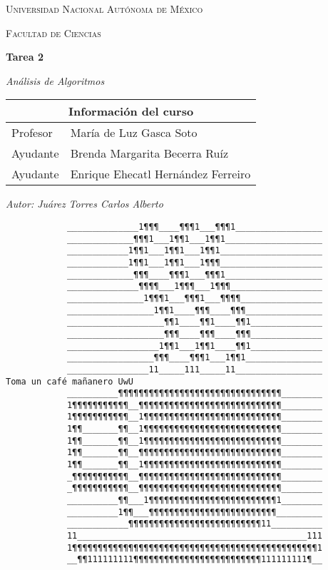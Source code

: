 \begin{titlepage}
	\centering
	
	{\scshape\LARGE Universidad Nacional Autónoma de México\par}
	\vspace{1cm}
	{\scshape\Large Facultad de Ciencias \par}
	{\huge\bfseries Tarea 2 \par}
	{\Large\itshape Análisis de Algoritmos \par}
	
	\begin{table}[ht]
	\centering
	\begin{tabular}{|l|l|}
	\hline
	\multicolumn{2}{|c|}{\cellcolor{pastelgreen}\textbf{Información del curso}} \\ \hline
	Profesor & María de Luz Gasca Soto \\
	Ayudante & Brenda Margarita Becerra Ruíz \\
	Ayudante & Enrique Ehecatl Hernández Ferreiro \\
	\hline
	\end{tabular}
	\end{table}

	{\large\itshape Autor: Juárez Torres Carlos Alberto \par}

	\begin{center}
		\begin{verbatim}
			______________1¶¶¶____¶¶¶1___¶¶¶1_________________
			_____________¶¶¶1___1¶¶1___1¶¶1___________________
			____________1¶¶1___1¶¶1___1¶¶1____________________
			____________1¶¶1___1¶¶1___1¶¶¶____________________
			_____________¶¶¶____¶¶¶1___¶¶¶1___________________
			______________¶¶¶¶___1¶¶¶___1¶¶¶__________________
			_______________1¶¶¶1___¶¶¶1___¶¶¶¶________________
			_________________1¶¶1____¶¶¶____¶¶¶_______________
			___________________¶¶1____¶¶1____¶¶1______________
			___________________¶¶¶____¶¶¶____¶¶¶______________
			__________________1¶¶1___1¶¶1____¶¶1______________
			_________________¶¶¶____¶¶¶1___1¶¶1_______________
			________________11_____111_____11_________________		Toma un café mañanero UwU
			__________¶¶¶¶¶¶¶¶¶¶¶¶¶¶¶¶¶¶¶¶¶¶¶¶¶¶¶¶¶¶¶¶________
			1¶¶¶¶¶¶¶¶¶¶¶__¶¶¶¶¶¶¶¶¶¶¶¶¶¶¶¶¶¶¶¶¶¶¶¶¶¶¶¶________
			1¶¶¶¶¶¶¶¶¶¶¶__1¶¶¶¶¶¶¶¶¶¶¶¶¶¶¶¶¶¶¶¶¶¶¶¶¶¶¶________
			1¶¶_______¶¶__1¶¶¶¶¶¶¶¶¶¶¶¶¶¶¶¶¶¶¶¶¶¶¶¶¶¶¶________
			1¶¶_______¶¶__1¶¶¶¶¶¶¶¶¶¶¶¶¶¶¶¶¶¶¶¶¶¶¶¶¶¶¶________
			1¶¶_______¶¶__¶¶¶¶¶¶¶¶¶¶¶¶¶¶¶¶¶¶¶¶¶¶¶¶¶¶¶¶________
			1¶¶_______¶¶__1¶¶¶¶¶¶¶¶¶¶¶¶¶¶¶¶¶¶¶¶¶¶¶¶¶¶¶________
			_¶¶¶¶¶¶¶¶¶¶¶__¶¶¶¶¶¶¶¶¶¶¶¶¶¶¶¶¶¶¶¶¶¶¶¶¶¶¶¶________
			_¶¶¶¶¶¶¶¶¶¶¶__¶¶¶¶¶¶¶¶¶¶¶¶¶¶¶¶¶¶¶¶¶¶¶¶¶¶¶¶________
			__________¶¶___1¶¶¶¶¶¶¶¶¶¶¶¶¶¶¶¶¶¶¶¶¶¶¶¶¶1________
			__________1¶¶___¶¶¶¶¶¶¶¶¶¶¶¶¶¶¶¶¶¶¶¶¶¶¶¶¶_________
			____________¶¶¶¶¶¶¶¶¶¶¶¶¶¶¶¶¶¶¶¶¶¶¶¶¶¶11__________
			11_____________________________________________111
			1¶¶¶¶¶¶¶¶¶¶¶¶¶¶¶¶¶¶¶¶¶¶¶¶¶¶¶¶¶¶¶¶¶¶¶¶¶¶¶¶¶¶¶¶¶¶¶¶1
			__¶¶111111111¶¶¶¶¶¶¶¶¶¶¶¶¶¶¶¶¶¶¶¶¶¶¶¶¶111111111¶__
			

\end{verbatim}
\end{center}
\end{titlepage}
